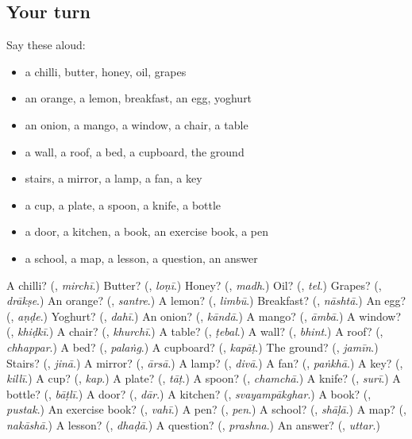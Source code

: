 \subsection*{Your turn}
Say these aloud:

\begin{itemize}
\raggedright
  \item a chilli, butter, honey, oil, grapes
  \item an orange, a lemon, breakfast, an egg, yoghurt
  \item an onion, a mango, a window, a chair, a table
  \item a wall, a roof, a bed, a cupboard, the ground
  \item stairs, a mirror, a lamp, a fan, a key
  \item a cup, a plate, a spoon, a knife, a bottle
  \item a door, a kitchen, a book, an exercise book, a pen
  \item a school, a map, a lesson, a question, an answer
\end{itemize}

\begin{tcolorbox}[breakable,colback=teal!4,colframe=teal!35!black,title={Before you move on}]
A chilli? (\textbf{}, \emph{mirchī}.) Butter? (\textbf{}, \emph{loṇī}.) Honey? (\textbf{}, \emph{madh}.) Oil? (\textbf{}, \emph{tel}.) Grapes? (\textbf{}, \emph{drākṣe}.) An orange? (\textbf{}, \emph{santre}.) A lemon? (\textbf{}, \emph{limbū}.) Breakfast? (\textbf{}, \emph{nāshtā}.) An egg? (\textbf{}, \emph{aṇḍe}.) Yoghurt? (\textbf{}, \emph{dahī}.) An onion? (\textbf{}, \emph{kāndā}.) A mango? (\textbf{}, \emph{āmbā}.) A window? (\textbf{}, \emph{khiḍkī}.) A chair? (\textbf{}, \emph{khurchī}.) A table? (\textbf{}, \emph{ṭebal}.) A wall? (\textbf{}, \emph{bhint}.) A roof? (\textbf{}, \emph{chhappar}.) A bed? (\textbf{}, \emph{palaṅg}.) A cupboard? (\textbf{}, \emph{kapāṭ}.) The ground? (\textbf{}, \emph{jamīn}.) Stairs? (\textbf{}, \emph{jinā}.) A mirror? (\textbf{}, \emph{ārsā}.) A lamp? (\textbf{}, \emph{divā}.) A fan? (\textbf{}, \emph{paṅkhā}.) A key? (\textbf{}, \emph{killī}.) A cup? (\textbf{}, \emph{kap}.) A plate? (\textbf{}, \emph{tāṭ}.) A spoon? (\textbf{}, \emph{chamchā}.) A knife? (\textbf{}, \emph{surī}.) A bottle? (\textbf{}, \emph{bāṭlī}.) A door? (\textbf{}, \emph{dār}.) A kitchen? (\textbf{}, \emph{svayampākghar}.) A book? (\textbf{}, \emph{pustak}.) An exercise book? (\textbf{}, \emph{vahī}.) A pen? (\textbf{}, \emph{pen}.) A school? (\textbf{}, \emph{shāḷā}.) A map? (\textbf{}, \emph{nakāshā}.) A lesson? (\textbf{}, \emph{dhaḍā}.) A question? (\textbf{}, \emph{prashna}.) An answer? (\textbf{}, \emph{uttar}.)
\end{tcolorbox}

